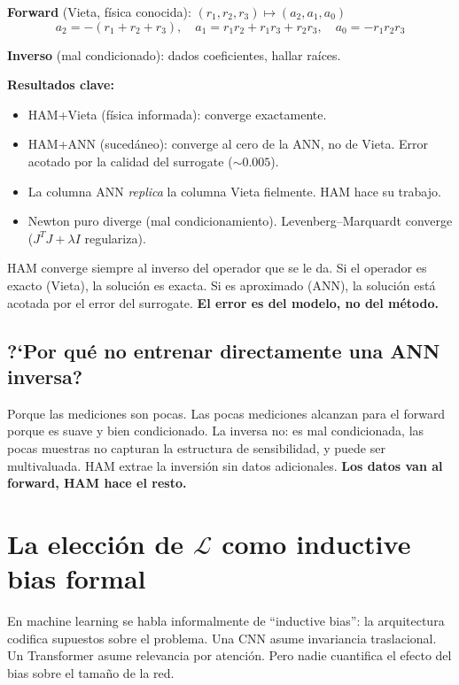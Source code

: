 \documentclass[11pt,a4paper]{article}
\begin{document}
\textbf{Forward} (Vieta, f\'isica conocida): $(r_1, r_2, r_3) \mapsto (a_2, a_1, a_0)$
$$a_2 = -(r_1+r_2+r_3), \quad a_1 = r_1 r_2 + r_1 r_3 + r_2 r_3, \quad a_0 = -r_1 r_2 r_3$$

\textbf{Inverso} (mal condicionado): dados coeficientes, hallar ra\'ices.

\textbf{Resultados clave:}
\begin{itemize}[nosep]
\item HAM+Vieta (f\'isica informada): converge exactamente.
\item HAM+ANN (suced\'aneo): converge al cero de la ANN, no de Vieta. Error acotado por la calidad del surrogate ($\sim 0.005$).
\item La columna ANN \emph{replica} la columna Vieta fielmente. HAM hace su trabajo.
\item Newton puro diverge (mal condicionamiento). Levenberg--Marquardt converge ($J^T J + \lambda I$ regulariza).
\end{itemize}

\begin{clave}
HAM converge siempre al inverso del operador que se le da. Si el operador es exacto (Vieta), la soluci\'on es exacta. Si es aproximado (ANN), la soluci\'on est\'a acotada por el error del surrogate. \textbf{El error es del modelo, no del m\'etodo.}
\end{clave}

\subsection{?`Por qu\'e no entrenar directamente una ANN inversa?}

Porque las mediciones son pocas. Las pocas mediciones alcanzan para el forward porque es suave y bien condicionado. La inversa no: es mal condicionada, las pocas muestras no capturan la estructura de sensibilidad, y puede ser multivaluada. HAM extrae la inversi\'on sin datos adicionales. \textbf{Los datos van al forward, HAM hace el resto.}


\section{La elecci\'on de $\mathcal{L}$ como inductive bias formal}

En machine learning se habla informalmente de ``inductive bias'': la arquitectura codifica supuestos sobre el problema. Una CNN asume invariancia traslacional. Un Transformer asume relevancia por atenci\'on. Pero nadie cuantifica el efecto del bias sobre el tama\~no de la red.
\end{document}
